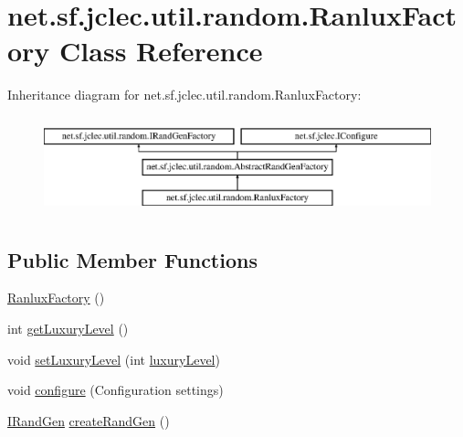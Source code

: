\hypertarget{classnet_1_1sf_1_1jclec_1_1util_1_1random_1_1_ranlux_factory}{\section{net.\-sf.\-jclec.\-util.\-random.\-Ranlux\-Factory Class Reference}
\label{classnet_1_1sf_1_1jclec_1_1util_1_1random_1_1_ranlux_factory}
}
Inheritance diagram for net.\-sf.\-jclec.\-util.\-random.\-Ranlux\-Factory\-:\begin{figure}[H]
\begin{center}
\leavevmode
\includegraphics[height=2.847458cm]{classnet_1_1sf_1_1jclec_1_1util_1_1random_1_1_ranlux_factory}
\end{center}
\end{figure}
\subsection*{Public Member Functions}
\begin{DoxyCompactItemize}
\item 
\hyperlink{classnet_1_1sf_1_1jclec_1_1util_1_1random_1_1_ranlux_factory_acdb8013b5abcc6d90bc4b74b02e83a07}{Ranlux\-Factory} ()
\item 
int \hyperlink{classnet_1_1sf_1_1jclec_1_1util_1_1random_1_1_ranlux_factory_a5b2357a7bd4fddbebd8f32c35b5f3537}{get\-Luxury\-Level} ()
\item 
void \hyperlink{classnet_1_1sf_1_1jclec_1_1util_1_1random_1_1_ranlux_factory_ad091b63b7f3436380f172f28a5003de1}{set\-Luxury\-Level} (int \hyperlink{classnet_1_1sf_1_1jclec_1_1util_1_1random_1_1_ranlux_factory_ad4c3040a1505d5eb9f24d87f879bec15}{luxury\-Level})
\item 
void \hyperlink{classnet_1_1sf_1_1jclec_1_1util_1_1random_1_1_ranlux_factory_afe444771948b703d1365d6e2b7c6dc40}{configure} (Configuration settings)
\item 
\hyperlink{interfacenet_1_1sf_1_1jclec_1_1util_1_1random_1_1_i_rand_gen}{I\-Rand\-Gen} \hyperlink{classnet_1_1sf_1_1jclec_1_1util_1_1random_1_1_ranlux_factory_a2e0991693d7c8bc11ab52fa289ad007f}{create\-Rand\-Gen} ()
\end{DoxyCompactItemize}
